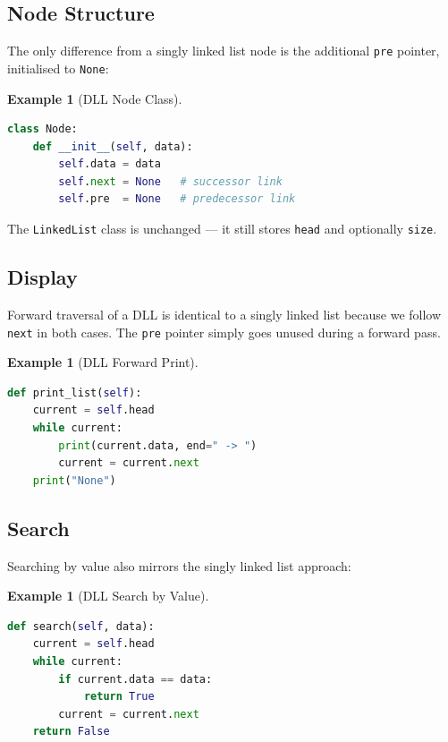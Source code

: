 \documentclass[11pt, a4paper, notitlepage]{report}
\theoremstyle{definition}
\theoremstyle{remark}
\theoremstyle{definition}
\newtheorem{example}[theorem]{Example}
\begin{document}
\subsection{Node Structure}
\label{subsec:dll-node}

The only difference from a singly linked list node is the additional
\texttt{pre} pointer, initialised to \texttt{None}:

\begin{example}[DLL Node Class]
\leavevmode
\begin{lstlisting}[language=Python]
class Node:
    def __init__(self, data):
        self.data = data
        self.next = None   # successor link
        self.pre  = None   # predecessor link
\end{lstlisting}
\end{example}

The \texttt{LinkedList} class is unchanged --- it still stores \texttt{head}
and optionally \texttt{size}.

\subsection{Display}
\label{subsec:dll-display}

Forward traversal of a DLL is identical to a singly linked list because we
follow \texttt{next} in both cases. The \texttt{pre} pointer simply goes unused
during a forward pass.

\begin{example}[DLL Forward Print]
\leavevmode
\begin{lstlisting}[language=Python]
def print_list(self):
    current = self.head
    while current:
        print(current.data, end=" -> ")
        current = current.next
    print("None")
\end{lstlisting}
\end{example}

\subsection{Search}
\label{subsec:dll-search}

Searching by value also mirrors the singly linked list approach:

\begin{example}[DLL Search by Value]
\leavevmode
\begin{lstlisting}[language=Python]
def search(self, data):
    current = self.head
    while current:
        if current.data == data:
            return True
        current = current.next
    return False
\end{lstlisting}
\end{example}
\end{document}
